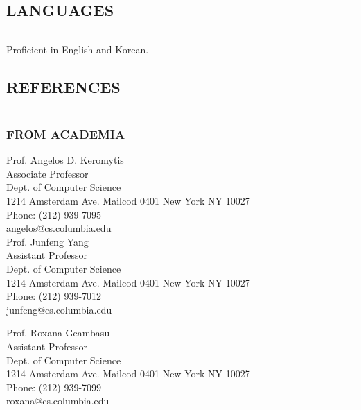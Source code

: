 \documentclass[10pt,a4]{article}
\begin{document}
\begin{small}
\subsection*{LANGUAGES}
\hrule
\vspace{0.2cm}
\begin{list}{}{}
	\item  Proficient in English and Korean.
\end{list}


\vspace{0.1cm}

\subsection*{REFERENCES}
\hrule
\vspace{0.2cm}

\subsubsection*{FROM ACADEMIA}
\begin{footnotesize}

\begin{multicols}{2} 
\noindent 
Prof. Angelos D. Keromytis \\
Associate Professor \\
Dept. of Computer Science \\
1214 Amsterdam Ave. Mailcod 0401
New York NY 10027 \\
Phone: (212) 939-7095 \\
angelos@cs.columbia.edu \\

\noindent
Prof. Junfeng Yang\\
Assistant Professor \\
Dept. of Computer Science \\
1214 Amsterdam Ave. Mailcod 0401
New York NY 10027 \\
Phone: (212) 939-7012 \\
junfeng@cs.columbia.edu \\
\columnbreak

\noindent
Prof. Roxana Geambasu\\
Assistant Professor \\
Dept. of Computer Science \\
1214 Amsterdam Ave. Mailcod 0401
New York NY 10027 \\
Phone: (212) 939-7099 \\
roxana@cs.columbia.edu \\


\end{multicols}
\end{footnotesize}
\end{small}
\end{document}
